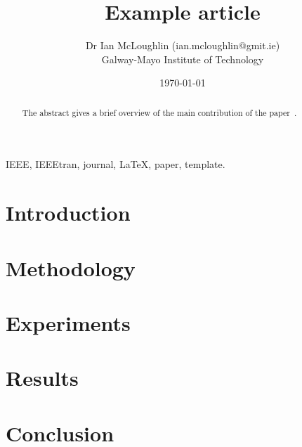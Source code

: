 \documentclass[journal]{IEEEtran}
\begin{document}
\title{Example article}

\author{Dr Ian McLoughlin (ian.mcloughlin@gmit.ie) \\ Galway-Mayo Institute of Technology}
\date{\today}

\maketitle


\begin{abstract}
  The abstract gives a brief overview of the main contribution of the paper~\cite{gmit:home}.
\end{abstract}

\begin{IEEEkeywords}
IEEE, IEEEtran, journal, \LaTeX, paper, template.
\end{IEEEkeywords}


\section{Introduction}

\section{Methodology}

\section{Experiments}

\section{Results}

\section{Conclusion}



\end{document}
